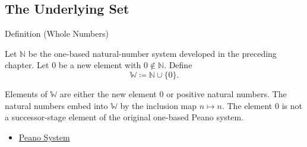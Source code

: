 \subsection*{The Underlying Set}

\begin{definitionbox}{Definition (Whole Numbers)}
\begin{definition}
\label{def:whole-numbers}
Let $\mathbb{N}$ be the one-based natural-number system developed in the
preceding chapter. Let $0$ be a new element with $0\notin\mathbb{N}$. Define
\[
\mathbb{W}\coloneqq \mathbb{N}\cup\{0\}.
\]
\end{definition}
\end{definitionbox}

\begin{remark*}[Interpretation]
Elements of $\mathbb{W}$ are either the new element $0$ or positive natural
numbers. The natural numbers embed into $\mathbb{W}$ by the inclusion map
$n\mapsto n$. The element $0$ is not a successor-stage element of the original
one-based Peano system.
\end{remark*}

\begin{dependencies}
\begin{itemize}
  \item \hyperref[def:peano-system]{Peano System}
\end{itemize}
\end{dependencies}
